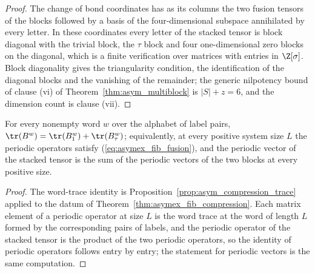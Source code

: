 \begin{proof}
    \leanok
    The change of bond coordinates has as its columns the two fusion
    tensors of the blocks followed by a basis of the four-dimensional
    subspace annihilated by every letter. In these coordinates every letter
    of the stacked tensor is block diagonal with the trivial block, the
    $\tau$ block and four one-dimensional zero blocks on the diagonal, which
    is a finite verification over matrices with entries in $\Z[\sigma]$.
    Block diagonality gives the triangularity condition, the identification
    of the diagonal blocks and the vanishing of the remainder; the generic
    nilpotency bound of clause (vi) of Theorem~\ref{thm:asym_multiblock} is
    $|S|+z=6$, and the dimension count is clause (vii).
\end{proof}

\begin{theorem}
    \label{thm:asymex_fib_fusion}
    \leanok
    For every nonempty word $w$ over the alphabet of label pairs,
    $\tr(B^w)=\tr(B_1^w)+\tr(B_\tau^w)$; equivalently, at every positive
    system size $L$ the periodic operators satisfy
    (\ref{eq:asymex_fib_fusion}), and the periodic vector of the stacked
    tensor is the sum of the periodic vectors of the two blocks at every
    positive size.
\end{theorem}

\begin{proof}
    \leanok
    The word-trace identity is
    Proposition~\ref{prop:asym_compression_trace} applied to the datum of
    Theorem~\ref{thm:asymex_fib_compression}. Each matrix element of a
    periodic operator at size $L$ is the word trace at the word of length
    $L$ formed by the corresponding pairs of labels, and the periodic
    operator of the stacked tensor is the product of the two periodic
    operators, so the identity of periodic operators follows entry by entry;
    the statement for periodic vectors is the same computation.
\end{proof}

